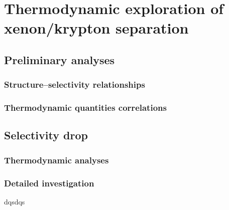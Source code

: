 \documentclass[thesis]{subfiles}
\begin{document}
\chapter{Thermodynamic exploration of xenon/krypton separation}
\vspace*{-1\baselineskip}
\section{Preliminary analyses}

\subsection{Structure--selectivity relationships}

\subsection{Thermodynamic quantities correlations}

\section{Selectivity drop}

\subsection{Thermodynamic analyses}

\subsection{Detailed investigation}
dqsdqs
\OnlyInSubfile{\printglobalbibliography}
\end{document}
